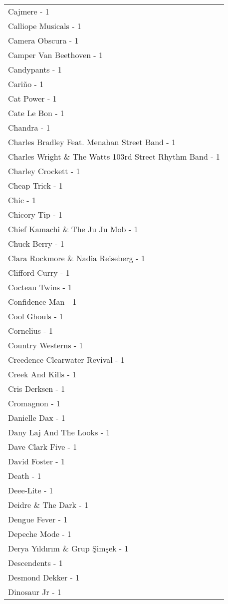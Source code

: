 \documentclass[
]{article}
\begin{document}
\begin{longtable}{l}
Cajmere - 1 \\ 
Calliope Musicals - 1 \\ 
Camera Obscura - 1 \\ 
Camper Van Beethoven - 1 \\ 
Candypants - 1 \\ 
Cariño - 1 \\ 
Cat Power - 1 \\ 
Cate Le Bon - 1 \\ 
Chandra - 1 \\ 
Charles Bradley Feat. Menahan Street Band - 1 \\ 
Charles Wright \& The Watts 103rd Street Rhythm Band - 1 \\ 
Charley Crockett - 1 \\ 
Cheap Trick - 1 \\ 
Chic - 1 \\ 
Chicory Tip - 1 \\ 
Chief Kamachi \& The Ju Ju Mob - 1 \\ 
Chuck Berry - 1 \\ 
Clara Rockmore \& Nadia Reiseberg - 1 \\ 
Clifford Curry - 1 \\ 
Cocteau Twins - 1 \\ 
Confidence Man - 1 \\ 
Cool Ghouls - 1 \\ 
Cornelius - 1 \\ 
Country Westerns - 1 \\ 
Creedence Clearwater Revival - 1 \\ 
Creek And Kills - 1 \\ 
Cris Derksen - 1 \\ 
Cromagnon - 1 \\ 
Danielle Dax - 1 \\ 
Dany Laj And The Looks - 1 \\ 
Dave Clark Five - 1 \\ 
David Foster - 1 \\ 
Death - 1 \\ 
Deee-Lite - 1 \\ 
Deidre \& The Dark - 1 \\ 
Dengue Fever - 1 \\ 
Depeche Mode - 1 \\ 
Derya Yıldırım \& Grup Şimşek - 1 \\ 
Descendents - 1 \\ 
Desmond Dekker - 1 \\ 
Dinosaur Jr - 1 \\ 

\end{longtable}
\end{document}

